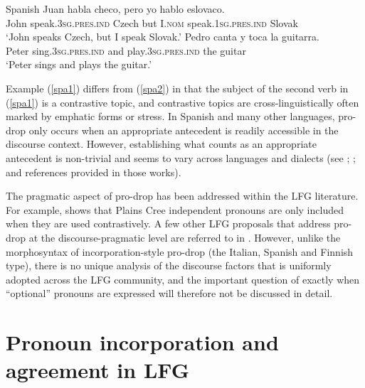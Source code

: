 \documentclass[output=paper,hidelinks]{langscibook}
\begin{document}
 \ea\label{spa}Spanish
 \ea\label{spa1}
 \gll Juan habla checo, pero yo hablo eslovaco. \\
John speak.\textsc{3sg.pres.ind}   Czech but I.\textsc{nom} speak.\textsc{1sg.pres.ind}   Slovak \\
\glt`John speaks Czech, but I speak Slovak.'
\ex \label{spa2}
\gll Pedro canta y  toca la guitarra. \\ 
Peter sing.\textsc{3sg.pres.ind}  and  play.\textsc{3sg.pres.ind}  the guitar \\
\glt `Peter sings and plays the guitar.' 
\z\z

\noindent Example (\ref{spa1}) differs from (\ref{spa2}) in that  the subject of the second verb in  (\ref{spa1})  is a contrastive topic, and contrastive topics are cross-linguistically often marked by emphatic forms or stress.   In Spanish  and many other languages,  pro-drop only occurs when  an  appropriate  antecedent  is readily accessible  in the  discourse  context.    However, establishing  what  counts   as an appropriate  antecedent  is non-trivial and seems to vary across languages and  dialects   (see \citealt{AlonsoAvalleAl2002}; \citealt{holmberg10}; and references provided in those works).


The pragmatic aspect of pro-drop has  been addressed within the LFG literature. For example, \citet[Chapters 4--5]{dahlstrom91}  shows that  Plains Cree  independent pronouns are only included when they are used contrastively.  A few other LFG  proposals that address pro-drop at the discourse-pragmatic level are referred to in . However, unlike the morphosyntax of  incorporation-style pro-drop (the Italian, Spanish and Finnish type), there is no  unique analysis of the discourse factors that is uniformly adopted across the LFG community, and the  important question of exactly when ``optional'' pronouns are expressed will therefore  not be discussed in  detail. 

 

 
 


\section{Pronoun incorporation and agreement in LFG} \label{sec:basics}
\end{document}
